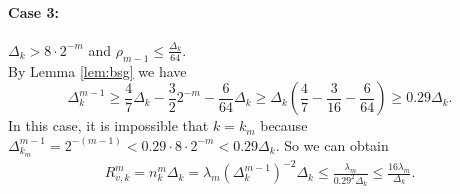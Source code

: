 \paragraph{Case 3:} $\Delta_k > 8 \cdot 2^{-m}$ and $\rho_{m-1} \leq \frac{\Delta_k}{64}$.\\
By Lemma \ref{lem:bsg} we have
\[\Delta_k^{m-1} \geq \frac{4}{7}\Delta_k - \frac{3}{2}2^{-m} - \frac{6}{64}\Delta_k \geq \Delta_k\left(\frac{4}{7} - \frac{3}{16} - \frac{6}{64}\right) \geq 0.29 \Delta_k.\]
In this case, it is impossible that $k=k_m$ because $\Delta_{k_m}^{m-1} = 2^{-(m-1)}<0.29\cdot 8\cdot 2^{-m}<0.29\Delta_k$.
So we can obtain
\begin{align*}
   R_{v,k}^m= n_k^m \Delta_k = \lambda_m(\Delta_k^{m-1})^{-2} \Delta_k
    \leq \frac{\lambda_m}{0.29^2 \Delta_k} 
    \leq \frac{16\lambda_m}{\Delta_k}.
\end{align*}

